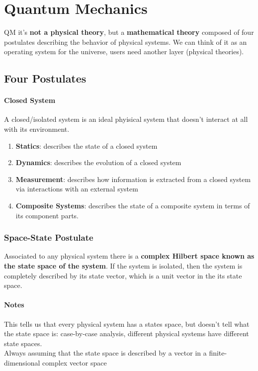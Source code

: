\documentclass[10pt]{report}
\begin{document}
\section{Quantum Mechanics}
QM it's \textbf{not a physical theory}, but a \textbf{mathematical theory} composed of four postulates describing the behavior of physical systems. We can think of it as an operating system for the universe, users need another layer (physical theories).
\subsection{Four Postulates}
\paragraph{Closed System} A closed/isolated system is an ideal phyisical system that doesn't interact at all with its environment.
\begin{enumerate}
	\item \textbf{Statics}: describes the state of a closed system
	\item \textbf{Dynamics}: describes the evolution of a closed system
	\item \textbf{Measurement}: describes how information is extracted from a closed system via interactions with an external system
	\item \textbf{Composite Systems}: describes the state of a composite system in terms of its component parts.
\end{enumerate}
\subsubsection{Space-State Postulate} Associated to any physical system there is a \textbf{complex Hilbert space known as the state space of the system}. If the system is isolated, then the system is completely described by its state vector, which is a unit vector in the its state space.
\paragraph{Notes} This tells us that every physical system has a states space, but doesn't tell what the state space is: case-by-case analysis, different physical systems have different state spaces.\\
Always assuming that the state space is described by a vector in a finite-dimensional complex vector space
\end{document}
